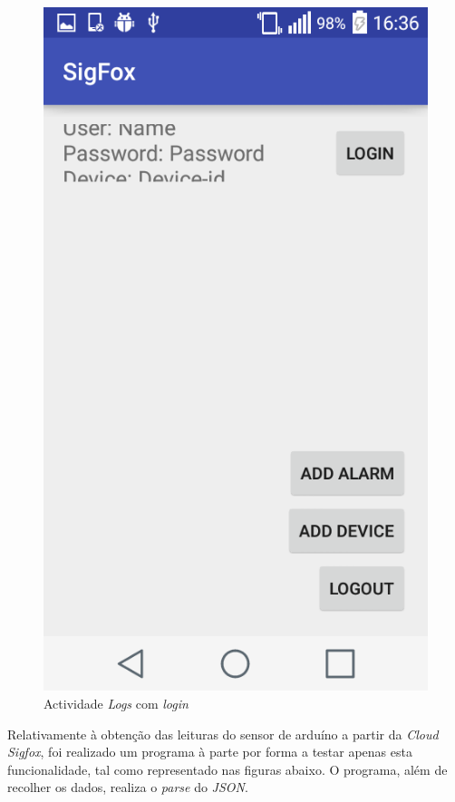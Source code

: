 \documentclass[a4paper]{article}
\begin{document}
\begin{figure}[H]
  \includegraphics[width=\linewidth]{login.png}
  \caption{Actividade \textit{Logs} com \textit{login}}\label{fig:login}
\endminipage
\end{figure}

Relativamente à obtenção das leituras do sensor de arduíno a partir da \textit{Cloud Sigfox}, foi realizado um programa à parte por forma a testar apenas esta funcionalidade, tal como representado nas figuras abaixo. O programa, além de recolher os dados, realiza o \textit{parse} do \textit{JSON}.
\end{document}
